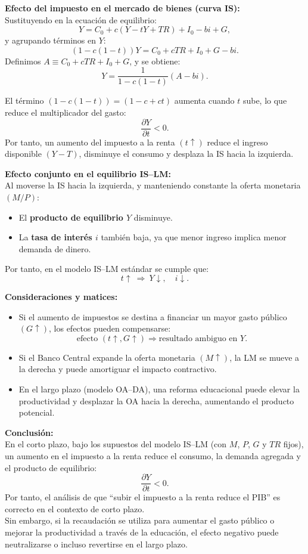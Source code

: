 \documentclass[11pt,addpoints]{article}
\begin{document}
\begin{enumerate}
\vspace{0.3cm}
\textbf{Efecto del impuesto en el mercado de bienes (curva IS):}\\
Sustituyendo en la ecuación de equilibrio:
\[
Y = C_0 + c(Y - tY + TR) + I_0 - b i + G,
\]
y agrupando términos en \(Y\):
\[
(1 - c(1 - t))Y = C_0 + cTR + I_0 + G - b i.
\]
Definimos \(A \equiv C_0 + cTR + I_0 + G\), y se obtiene:
\[
Y = \frac{1}{1 - c(1 - t)}(A - b i).
\]

El término \((1 - c(1 - t)) = (1 - c + c t)\) aumenta cuando \(t\) sube, lo que reduce el multiplicador del gasto:
\[
\frac{\partial Y}{\partial t} < 0.
\]
Por tanto, un aumento del impuesto a la renta \((t \uparrow)\) reduce el ingreso disponible \((Y - T)\), disminuye el consumo y desplaza la IS hacia la izquierda.

\vspace{0.3cm}
\textbf{Efecto conjunto en el equilibrio IS–LM:}\\
Al moverse la IS hacia la izquierda, y manteniendo constante la oferta monetaria \((M/P)\):
\begin{itemize}
  \item El \textbf{producto de equilibrio \(Y\)} disminuye.
  \item La \textbf{tasa de interés \(i\)} también baja, ya que menor ingreso implica menor demanda de dinero.
\end{itemize}

Por tanto, en el modelo IS–LM estándar se cumple que:
\[
t \uparrow \ \Rightarrow \ Y \downarrow, \quad i \downarrow.
\]

\vspace{0.3cm}
\textbf{Consideraciones y matices:}
\begin{itemize}
  \item Si el aumento de impuestos se destina a financiar un mayor gasto público \((G \uparrow)\), los efectos pueden compensarse: 
  \[
  \text{efecto } (t\uparrow, G\uparrow) \Rightarrow \text{resultado ambiguo en } Y.
  \]
  \item Si el Banco Central expande la oferta monetaria \((M \uparrow)\), la LM se mueve a la derecha y puede amortiguar el impacto contractivo.
  \item En el largo plazo (modelo OA–DA), una reforma educacional puede elevar la productividad y desplazar la OA hacia la derecha, aumentando el producto potencial.
\end{itemize}
\newpage
\vspace*{0.1cm}
\textbf{Conclusión:}\\
En el corto plazo, bajo los supuestos del modelo IS–LM (con \(M\), \(P\), \(G\) y \(TR\) fijos), un aumento en el impuesto a la renta reduce el consumo, la demanda agregada y el producto de equilibrio:
\[
\frac{\partial Y}{\partial t} < 0.
\]
Por tanto, el análisis de que “subir el impuesto a la renta reduce el PIB” es correcto en el contexto de corto plazo.\\[0.2cm]
Sin embargo, si la recaudación se utiliza para aumentar el gasto público o mejorar la productividad a través de la educación, el efecto negativo puede neutralizarse o incluso revertirse en el largo plazo.



\end{enumerate}
\end{document}
